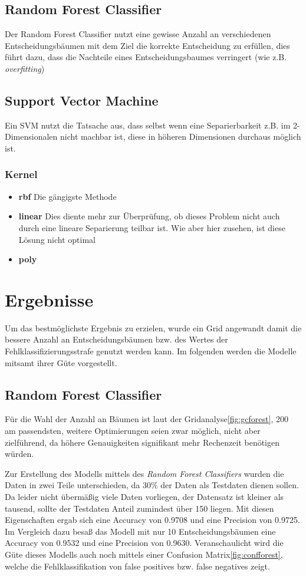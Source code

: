 \documentclass[a4paper,12pt]{article}
\begin{document}
\subsection{Random Forest Classifier}
Der Random Forest Classifier nutzt eine gewisse Anzahl an verschiedenen Entscheidungsbäumen mit dem Ziel die korrekte Entscheidung zu erfüllen,
dies führt dazu, dass die Nachteile eines Entscheidungsbaumes verringert (wie z.B. \textit{overfitting})
\subsection{Support Vector Machine}
Ein SVM nutzt die Tatsache aus, dass selbst wenn eine Separierbarkeit z.B. im 2-Dimensionalen nicht machbar ist,
diese in höheren Dimensionen durchaus möglich ist.
\subsubsection{Kernel}
\begin{itemize}
    \item \textbf{rbf} Die gängigste Methode
    \item \textbf{linear} Dies diente mehr zur Überprüfung, ob dieses Problem nicht auch durch eine lineare Separierung teilbar ist.\newline
    Wie aber hier zusehen, ist diese Lösung nicht optimal
    \item \textbf{poly}
\end{itemize}
\section{Ergebnisse}
Um das bestmöglichste Ergebnis zu erzielen, wurde ein Grid angewandt damit die bessere Anzahl an Entscheidungsbäumen bzw.
des Wertes der Fehlklassifizierungsstrafe genutzt werden kann. Im folgenden werden die Modelle mitsamt ihrer Güte vorgestellt.
\subsection{Random Forest Classifier}
Für die Wahl der Anzahl an Bäumen ist laut der Gridanalyse\ref{fig:gcforest}, 200 am passendsten, weitere Optimierungen seien zwar möglich, nicht aber zielführend,
da höhere Genauigkeiten signifikant mehr Rechenzeit benötigen würden.\newline

Zur Erstellung des Modells mittels des \textit{Random Forest Classifiers} wurden die Daten in zwei Teile unterschieden, da 30\% der Daten als
Testdaten dienen sollen. Da leider nicht übermäßig viele Daten vorliegen, der Datensatz ist kleiner als tausend, sollte der Testdaten Anteil zumindest
über 150 liegen.\newline
Mit diesen Eigenschaften ergab sich eine Accuracy von 0.9708 und eine Precision von 0.9725. Im Vergleich dazu besaß das Modell
mit nur 10 Entscheidungsbäumen eine Accuracy von 0.9532 und eine Precision von 0.9630.\newline
Veranschaulicht wird die Güte dieses Modells auch noch mittels einer Confusion Matrix\ref{fig:confforest}, welche die Fehlklassifikation von false positives bzw. false
negatives zeigt.\newline
\end{document}
